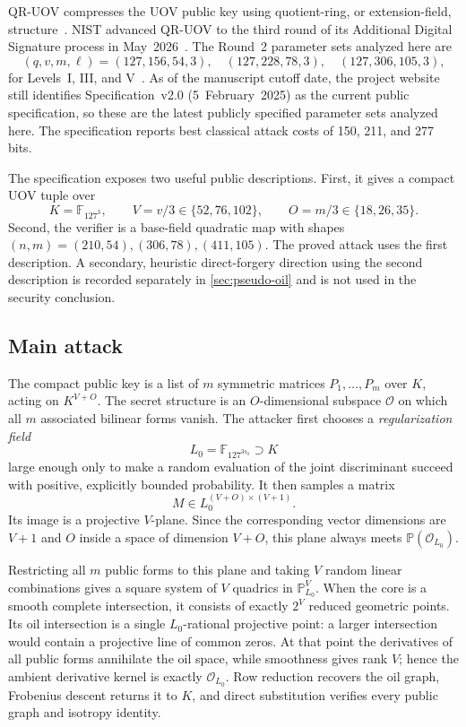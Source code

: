 \documentclass[10pt,a4paper]{article}
\newcommand{\F}{\mathbb F}
\newcommand{\PP}{\mathbb P}
\newcommand{\cO}{\mathcal O}
\newcommand{\QRUOV}{\textsf{QR-UOV}}
\begin{document}
\QRUOV{} compresses the UOV public key using quotient-ring, or extension-field, structure~\cite{QRUOV2021}.  NIST advanced \QRUOV{} to the third round of its Additional Digital Signature process in May~2026~\cite{NISTRound3,NISTIR8610}.  The Round~2 parameter sets analyzed here are
\[
(q,v,m,\ell)=(127,156,54,3),\quad(127,228,78,3),\quad(127,306,105,3),
\]
for Levels~I, III, and V~\cite{QRUOVSpec}.  As of the manuscript cutoff date, the project website still identifies Specification~v2.0 (5~February~2025) as the current public specification, so these are the latest publicly specified parameter sets analyzed here.  The specification reports best classical attack costs of 150, 211, and 277 bits.

The specification exposes two useful public descriptions.  First, it gives a compact UOV tuple over
\[
K=\F_{127^3},\qquad V=v/3\in\{52,76,102\},\qquad O=m/3\in\{18,26,35\}.
\]
Second, the verifier is a base-field quadratic map with shapes $(n,m)=(210,54),(306,78),(411,105)$.  The proved attack uses the first description.  A secondary, heuristic direct-forgery direction using the second description is recorded separately in \cref{sec:pseudo-oil} and is not used in the security conclusion.

\subsection{Main attack}

The compact public key is a list of $m$ symmetric matrices $P_1,\ldots,P_m$ over $K$, acting on $K^{V+O}$.  The secret structure is an $O$-dimensional subspace $\cO$ on which all $m$ associated bilinear forms vanish.  The attacker first chooses a \emph{regularization field}
\[
L_0=\F_{127^{3s_0}}\supset K
\]
large enough only to make a random evaluation of the joint discriminant succeed with positive, explicitly bounded probability.  It then samples a matrix
\[
M\in L_0^{(V+O)\times(V+1)}.
\]
Its image is a projective $V$-plane.  Since the corresponding vector dimensions are $V+1$ and $O$ inside a space of dimension $V+O$, this plane always meets $\PP(\cO_{L_0})$.

Restricting all $m$ public forms to this plane and taking $V$ random linear combinations gives a square system of $V$ quadrics in $\PP^V_{L_0}$.  When the core is a smooth complete intersection, it consists of exactly $2^V$ reduced geometric points.  Its oil intersection is a single $L_0$-rational projective point: a larger intersection would contain a projective line of common zeros.  At that point the derivatives of all public forms annihilate the oil space, while smoothness gives rank $V$; hence the ambient derivative kernel is exactly $\cO_{L_0}$.  Row reduction recovers the oil graph, Frobenius descent returns it to $K$, and direct substitution verifies every public graph and isotropy identity.
\end{document}

